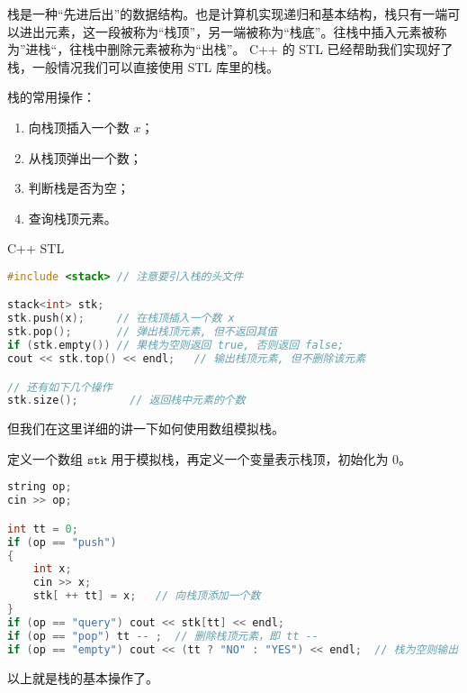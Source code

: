 
栈是一种“先进后出”的数据结构。也是计算机实现递归和基本结构，栈只有一端可以进出元素，这一段被称为“栈顶”，另一端被称为“栈底”。往栈中插入元素被称为”进栈“，往栈中删除元素被称为“出栈”。
C++ 的 STL 已经帮助我们实现好了栈，一般情况我们可以直接使用 STL 库里的栈。

栈的常用操作：
\begin{enumerate}
\item 向栈顶插入一个数 $x$；
\item 从栈顶弹出一个数；
\item 判断栈是否为空；
\item 查询栈顶元素。
\end{enumerate}

C++ STL
\begin{lstlisting}[language=cpp]
#include <stack> // 注意要引入栈的头文件

stack<int> stk;
stk.push(x);     // 在栈顶插入一个数 x
stk.pop();       // 弹出栈顶元素, 但不返回其值
if (stk.empty()) // 果栈为空则返回 true, 否则返回 false;
cout << stk.top() << endl;   // 输出栈顶元素, 但不删除该元素

// 还有如下几个操作
stk.size();        // 返回栈中元素的个数

\end{lstlisting}

但我们在这里详细的讲一下如何使用数组模拟栈。

定义一个数组 $\mathtt{stk}$ 用于模拟栈，再定义一个变量表示栈顶，初始化为 $0$。

\begin{lstlisting}[language=cpp]
string op;
cin >> op;

int tt = 0;
if (op == "push")
{
    int x;
    cin >> x;
    stk[ ++ tt] = x;   // 向栈顶添加一个数
} 
if (op == "query") cout << stk[tt] << endl;
if (op == "pop") tt -- ;  // 删除栈顶元素，即 tt -- 
if (op == "empty") cout << (tt ? "NO" : "YES") << endl;  // 栈为空则输出 YES，否则输出 NO
\end{lstlisting}

以上就是栈的基本操作了。